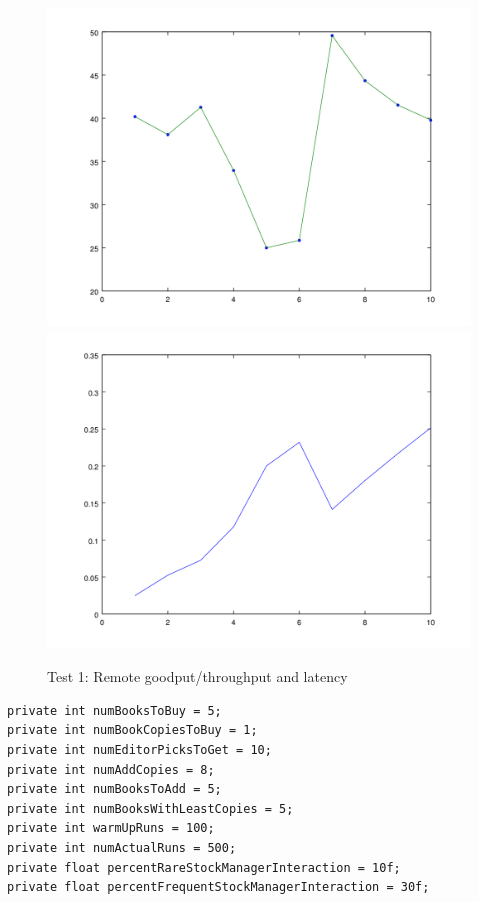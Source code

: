 \documentclass{article}      %
\begin{document}
\begin{figure}[ht]
\centering
 \includegraphics[scale=.33]{graphs/graph2-goodput}
 \includegraphics[scale=.33]{graphs/graph2-latency}
\caption{Test 1: Remote goodput/throughput and latency \label{overflow}}
\end{figure}

\begin{verbatim}
private int numBooksToBuy = 5;
private int numBookCopiesToBuy = 1;
private int numEditorPicksToGet = 10;
private int numAddCopies = 8;
private int numBooksToAdd = 5;
private int numBooksWithLeastCopies = 5;
private int warmUpRuns = 100;
private int numActualRuns = 500;
private float percentRareStockManagerInteraction = 10f;
private float percentFrequentStockManagerInteraction = 30f;
\end{verbatim}
\end{document}
